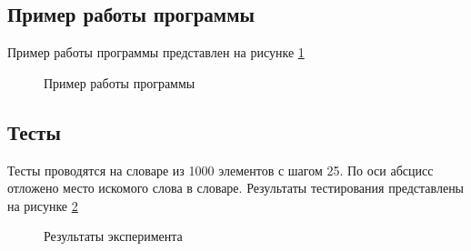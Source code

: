 \documentclass{article}
\begin{document}
	\subsection{Пример работы программы}
	Пример работы программы представлен на рисунке \hyperref[programmWork]{\ref{programmWork}}
	 	\begin{figure}[h!]
		 	\caption{Пример работы программы}
		 	\label{programmWork}
	 	\end{figure}

	\subsection{Тесты}
	Тесты проводятся на словаре из 1000 элементов с шагом 25. По оси абсцисс отложено место искомого слова в словаре. Результаты тестирования представлены на рисунке \hyperref[tests]{\ref{tests}}
	 	\begin{figure}[h!]
		 	\caption{Результаты эксперимента}
		 	\label{tests}
	 	\end{figure}
	\newpage
\end{document}

